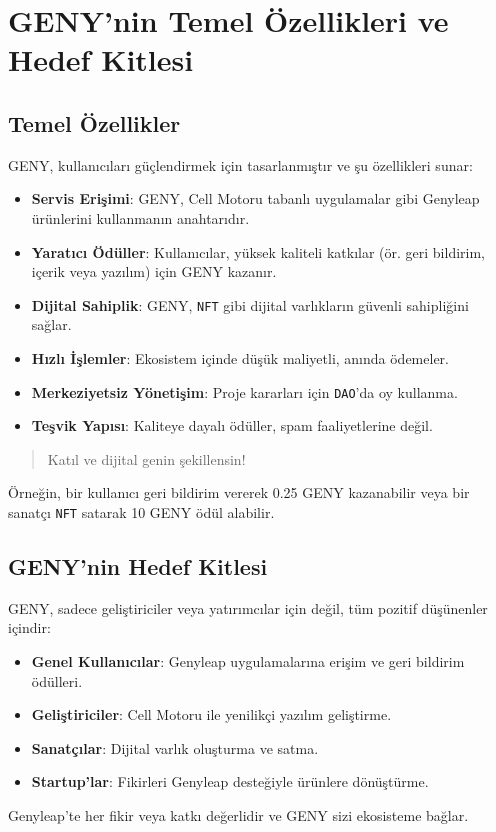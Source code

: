 \documentclass[a4paper,12pt,openany]{book}
\begin{document}
\section*{GENY’nin Temel Özellikleri ve Hedef Kitlesi}
\subsection*{Temel Özellikler}
GENY, kullanıcıları güçlendirmek için tasarlanmıştır ve şu özellikleri sunar:
\begin{itemize}
    \item \textbf{Servis Erişimi}: GENY, Cell Motoru tabanlı uygulamalar gibi Genyleap ürünlerini kullanmanın anahtarıdır.
    \item \textbf{Yaratıcı Ödüller}: Kullanıcılar, yüksek kaliteli katkılar (ör. geri bildirim, içerik veya yazılım) için GENY kazanır.
    \item \textbf{Dijital Sahiplik}: GENY, \texttt{NFT} gibi dijital varlıkların güvenli sahipliğini sağlar.
    \item \textbf{Hızlı İşlemler}: Ekosistem içinde düşük maliyetli, anında ödemeler.
    \item \textbf{Merkeziyetsiz Yönetişim}: Proje kararları için \texttt{DAO}’da oy kullanma.
    \item \textbf{Teşvik Yapısı}: Kaliteye dayalı ödüller, spam faaliyetlerine değil.
\end{itemize}
\begin{quote}
Katıl ve dijital genin şekillensin!
\end{quote}
Örneğin, bir kullanıcı geri bildirim vererek 0.25 GENY kazanabilir veya bir sanatçı \texttt{NFT} satarak 10 GENY ödül alabilir.

\subsection*{GENY’nin Hedef Kitlesi}
GENY, sadece geliştiriciler veya yatırımcılar için değil, tüm pozitif düşünenler içindir:
\begin{itemize}
    \item \textbf{Genel Kullanıcılar}: Genyleap uygulamalarına erişim ve geri bildirim ödülleri.
    \item \textbf{Geliştiriciler}: Cell Motoru ile yenilikçi yazılım geliştirme.
    \item \textbf{Sanatçılar}: Dijital varlık oluşturma ve satma.
    \item \textbf{Startup’lar}: Fikirleri Genyleap desteğiyle ürünlere dönüştürme.
\end{itemize}
Genyleap’te her fikir veya katkı değerlidir ve GENY sizi ekosisteme bağlar.
\newpage
\end{document}
